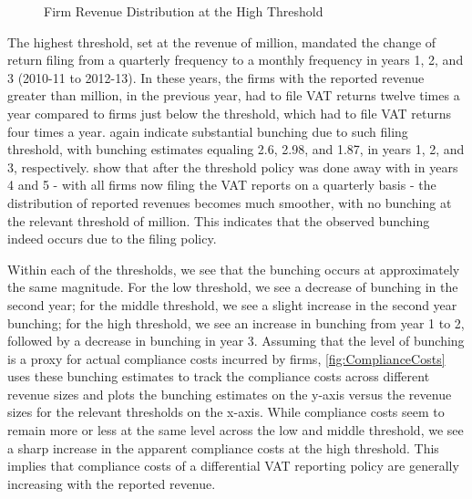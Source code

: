 \begin{figure}[ht!]
{    \label{fig:HighestThreshold-E}
    }
  \caption{Firm Revenue Distribution at the High Threshold}
  \label{fig:HighestThreshold}
\end{figure}

The highest threshold, set at the revenue of  million, mandated the change of return filing from a quarterly frequency to a monthly frequency in years 1, 2, and 3 (2010-11 to 2012-13). In these years, the firms with the reported revenue greater than  million, in the previous year, had to file VAT returns twelve times a year compared to firms just below the threshold, which had to file VAT returns four times a year.  again indicate substantial bunching due to such filing threshold, with bunching estimates equaling 2.6, 2.98, and 1.87, in years 1, 2, and 3, respectively.  show that after the threshold policy was done away with in years 4 and 5 - with all firms now filing the VAT reports on a quarterly basis - the distribution of reported revenues becomes much smoother, with no bunching at the relevant threshold of  million. This indicates that the observed bunching indeed occurs due to the filing policy.

Within each of the thresholds, we see that the bunching occurs at approximately the same magnitude. For the low threshold, we see a decrease of bunching in the second year; for the middle threshold, we see a slight increase in the second year bunching; for the high threshold, we see an increase in bunching from year 1 to 2, followed by a decrease in bunching in year 3. Assuming that the level of bunching is a proxy for actual compliance costs incurred by firms, \cref{fig:ComplianceCosts} uses these bunching estimates to track the compliance costs across different revenue sizes and plots the bunching estimates on the y-axis versus the revenue sizes for the relevant thresholds on the x-axis. While compliance costs seem to remain more or less at the same level across the low and middle threshold, we see a sharp increase in the apparent compliance costs at the high threshold. This implies that compliance costs of a differential VAT reporting policy are generally increasing with the reported revenue.

